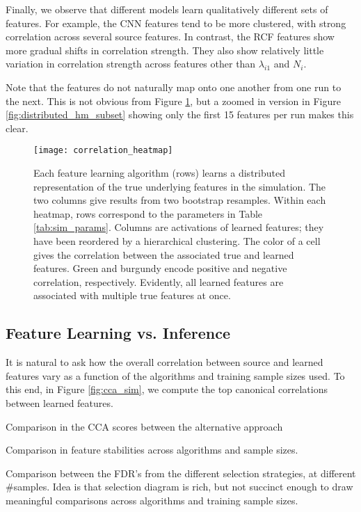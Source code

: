 Finally, we observe that different models learn qualitatively different sets of
features. For example, the CNN features tend to be more clustered, with strong
correlation across several source features. In contrast, the RCF features show
more gradual shifts in correlation strength. They also show relatively little
variation in correlation strength across features other than $\lambda_{i1}$ and
$N_{i}$.

Note that the features do not naturally map onto one another from one run to the
next. This is not obvious from Figure \ref{fig:distributed_hm}, but a zoomed in
version in Figure \ref{fig:distributed_hm_subset} showing only the first 15
features per run makes this clear.

\begin{figure}
  \centering
  \texttt{[image: correlation\_heatmap]}
  \caption{Each feature learning algorithm (rows) learns a distributed
    representation of the true underlying features in the simulation. The two
    columns give results from two bootstrap resamples. Within each heatmap, rows
    correspond to the parameters in Table \ref{tab:sim_params}. Columns are
    activations of learned features; they have been reordered by a hierarchical
    clustering. The color of a cell gives the correlation between the associated
    true and learned features. Green and burgundy encode positive and negative
    correlation, respectively. Evidently, all learned features are associated
    with multiple true features at once.}
  \label{fig:distributed_hm}
\end{figure}

\subsection{Feature Learning vs. Inference}

It is natural to ask how the overall correlation between source and learned
features vary as a function of the algorithms and training sample sizes used. To
this end, in Figure \ref{fig:cca_sim}, we compute the top canonical correlations
between learned features.

Comparison in the CCA scores between the alternative approach

Comparison in feature stabilities across algorithms and sample sizes.

Comparison between the FDR's from the different selection strategies, at
different #samples. Idea is that selection diagram is rich, but not succinct
enough to draw meaningful comparisons across algorithms and training sample
sizes.

